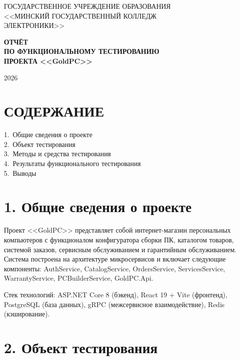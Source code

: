 \documentclass[12pt,a4paper]{article}
\begin{document}
\thispagestyle{empty}
\begin{center}
ГОСУДАРСТВЕННОЕ УЧРЕЖДЕНИЕ ОБРАЗОВАНИЯ\\
<<МИНСКИЙ ГОСУДАРСТВЕННЫЙ КОЛЛЕДЖ\\
ЭЛЕКТРОНИКИ>>
\end{center}

\vspace{3cm}

\begin{center}
{\bfseries ОТЧЁТ\\
ПО ФУНКЦИОНАЛЬНОМУ ТЕСТИРОВАНИЮ\\
ПРОЕКТА <<GoldPC>>}
\end{center}

\vspace{2cm}

\begin{center}
2026
\end{center}

\vfill

\newpage

\section*{СОДЕРЖАНИЕ}

1.~Общие сведения о проекте\\
2.~Объект тестирования\\
3.~Методы и средства тестирования\\
4.~Результаты функционального тестирования\\
5.~Выводы

\newpage

\section{1. Общие сведения о проекте}

Проект <<GoldPC>> представляет собой интернет-магазин персональных компьютеров с функционалом конфигуратора сборки ПК, каталогом товаров, системой заказов, сервисным обслуживанием и гарантийным обслуживанием. Система построена на архитектуре микросервисов и включает следующие компоненты: AuthService, CatalogService, OrdersService, ServicesService, WarrantyService, PCBuilderService, GoldPC.Api.

Стек технологий: ASP.NET Core 8 (бэкенд), React 19 + Vite (фронтенд), PostgreSQL (база данных), gRPC (межсервисное взаимодействие), Redis (кэширование).

\section{2. Объект тестирования}
\end{document}
